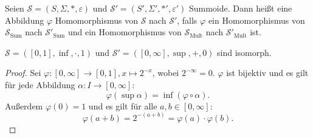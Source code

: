 \documentclass{article}
\begin{document}
\begin{definition}
  Seien $\mathcal{S} = (S, \Sigma, \ast, \varepsilon)$ und $\mathcal{S}' = (S', \Sigma', \ast', \varepsilon')$ Summoide.
  Dann heißt eine Abbildung $\varphi$ Homomorphismus von $\mathcal{S}$ nach $\mathcal{S}'$, falls
  $\varphi$ ein Homomorphismus von $\mathcal{S}_\text{Sum}$ nach $\mathcal{S}'_\text{Sum}$ und 
  ein Homomorphismus von $\mathcal{S}_\text{Mult}$ nach $\mathcal{S}'_\text{Mult}$ ist.
\end{definition}

\begin{theorem}
  $\mathcal{S} = ([0, 1], \inf, \cdot, 1)$ und $\mathcal{S}' = ([0, \infty], \sup, +, 0)$ sind isomorph.
\end{theorem}
\begin{proof}
  Sei $\varphi \colon [0, \infty] \to [0, 1], x \mapsto 2^{-x}$, wobei $2^{-\infty} = 0$.
  $\varphi$ ist bijektiv und es gilt für jede Abbildung $\alpha \colon I \to [0, \infty]$:
  \begin{equation*}
    \varphi(\sup \alpha) = \inf(\varphi \circ \alpha).
  \end{equation*}
  Außerdem $\varphi(0) = 1$ und es gilt für alle $a, b \in [0, \infty]$:
  \begin{equation*}
    \varphi(a + b) = 2^{-(a+b)} = \varphi(a) \cdot \varphi(b).
  \end{equation*}
\end{proof}
\end{document}
